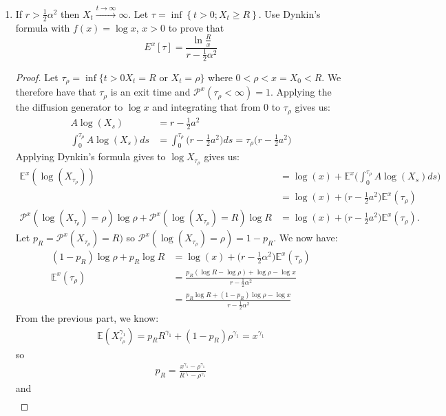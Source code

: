 \documentclass[11pt]{article}
\renewcommand{\P}{\mathbb{P}}
\newcommand{\ga}{\alpha}
\newcommand{\gc}{y}
\newcommand{\gr}{\rho}
\renewcommand{\gc}{\gamma}
\renewcommand{\to}{\longrightarrow}
\renewcommand{\P}{\mathcal{P}}
\newcommand{\E}{\mathbb{E}}
\begin{document}
\begin{enumerate}
\begin{proof}
\begin{align*}
\end{align*}
as expected.
\end{proof}
\item If $r>\frac{1}{2}\ga^2$ then $X_t \xrightarrow{t \to \infty} \infty$.  Let $\tau = \inf \left\{ t > 0 ; X _ { t } \geq R \right\}$.  Use Dynkin's formula with $f(x) = \log x$, $x>0$ to prove that $$
E ^ { x } [ \tau ] = \frac { \ln \frac { R } { x } } { r - \frac { 1 } { 2 } \alpha ^ { 2 } }
$$
\begin{proof}
Let $\tau_\rho= \inf \{ t>0 X_t = R \text{ or }X_t = \rho \}$ where $0<\rho<x=X_0<R$.  We therefore have that $\tau_{\rho}$ is an exit time and $\P^x(\tau_{\gr}<\infty)=1$.  Applying the the diffusion generator to $\log x$ and integrating that from $0$ to $\tau_\gr$ gives us:
\begin{align*}
A \log(X_s) &= r - \frac{1}{2}a^2\\
\int_0^{\tau_\gr} A \log(X_s) ds &= \int_0^{\tau_{\gr}} \Big(r- \frac{1}{2}a^2 \Big) ds = \tau_\gr \big( r - \frac{1}{2}a^2 \big)
\end{align*}
Applying Dynkin's formula gives to $\log X_{\tau_\gr}$ gives us:
\begin{align*}
\E^x( \log(X_{\tau_\rho})) &= \log(x) + \E^x \bigg(\int_0^{\tau_\gr} A \log(X_s) ds \bigg)\\
&= \log(x) + \big( r - \frac{1}{2}a^2 \big) \E^x(\tau_\gr )\\
\P^x(\log(X_{\tau_\gr}) = \gr) \log \gr + \P^x(\log(X_{\tau_\gr}) = R) \log R &= \log(x) + \big( r - \frac{1}{2}a^2 \big) \E^x(\tau_\gr ).
\end{align*}
Let $p_R = \P^x(X_{\tau_\gr}) = R)$ so $ \P^x(\log(X_{\tau_\gr}) = \gr)=1-p_R$.  We now have:
\begin{align*}
(1-p_R) \log \gr  + p_R \log R  &= \log(x) + \big( r - \frac{1}{2}\ga^2 \big) \E^x(\tau_\gr )\\
\E^x( \tau_\gr) &= \frac{p_R(\log R - \log \gr) +\log \gr -\log x}{r-\frac{1}{2}\ga^2}\\
&= \frac{p_R \log R + (1-p_R) \log \gr - \log x}{r -\frac{1}{2}\ga^2}
\end{align*}
From the previous part, we know:
\begin{align*}
\E(X_{\tau_{\gr}}^{\gc_1})= p_R R^{\gc_1} + (1-p_R) \gr^{\gc_1} = x^{\gc_1}
\end{align*}
so \begin{align*}
p_R = \frac{x^{\gc_1}-\gr^{\gc_1}}{R^{\gc_1}-\gr^{\gc_1}}
\end{align*}
and
\begin{align*}

\end{align*}
\end{proof}
\end{enumerate}
\end{document}
